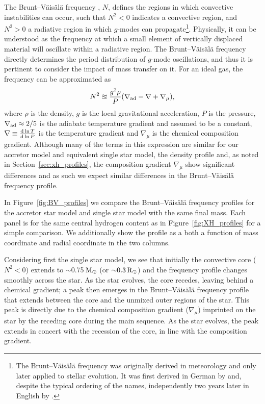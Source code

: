 \documentclass[desactivate]{aa}
\begin{document}
The Brunt–Väisälä frequency \citep{BVF-vaisala, BVF-brunt}, $N$, defines the regions in which convective instabilities can occur, such that $N^2 < 0$ indicates a convective region, and $N^2 > 0$ a radiative region in which $g$-modes can propagate\footnote{The Brunt–Väisälä frequency was originally derived in meteorology and only later applied to stellar evolution. It was first derived in German by \citet{BVF-vaisala} and, despite the typical ordering of the names, independently two years later in English by \citet{BVF-brunt}.}.
Physically, it can be understood as the frequency at which a small element of vertically displaced material will oscillate within a radiative region.
The Brunt–Väisälä frequency directly determines the period distribution of $g$-mode oscillations, and thus it is pertinent to consider the impact of mass transfer on it. For an ideal gas, the frequency can be approximated as
\begin{equation}\label{eq:bvf}
    N^2 \approxeq \frac{g^2 \rho}{P} \qty(\nabla_{\rm ad} - \nabla + \nabla_\mu),
\end{equation}
where $\rho$ is the density, $g$ is the local gravitational acceleration, $P$ is the pressure, $\nabla_{\rm ad} \approx 2/5$ is the adiabatc temperature gradient and assumed to be a constant, $\nabla \equiv \dv{\ln T}{\ln P}$ is the temperature gradient and $\nabla_\mu$ is the chemical composition gradient. Although many of the terms in this expression are similar for our accretor model and equivalent single star model, the density profile and, as noted in Section~\ref{sec:xh_profiles}, the composition gradient $\nabla_\mu$ show significant differences and as such we expect similar differences in the Brunt–Väisälä frequency profile.

In Figure~\ref{fig:BV_profiles} we compare the Brunt–Väisälä frequency profiles for the accretor star model and single star model with the same final mass. Each panel is for the same central hydrogen content as in Figure~\ref{fig:XH_profiles} for a simple comparison. We additionally show the profile as a both a function of mass coordinate and radial coordinate in the two columns.

Considering first the single star model, we see that initially the convective core ($N^2<0$) extends to ${\sim}$0.75$\,{\rm M_\odot}$ (or ${\sim}0.3\,{\rm R_\odot}$) and the frequency profile changes smoothly across the star. As the star evolves, the core recedes, leaving behind a chemical gradient; a peak then emerges in the Brunt–Väisälä frequency profile that extends between the core and the unmixed outer regions of the star. This peak is directly due to the chemical composition gradient ($\nabla_\mu$) imprinted on the star by the receding core during the main sequence. As the star evolves, the peak extends in concert with the recession of the core, in line with the composition gradient.
\end{document}
